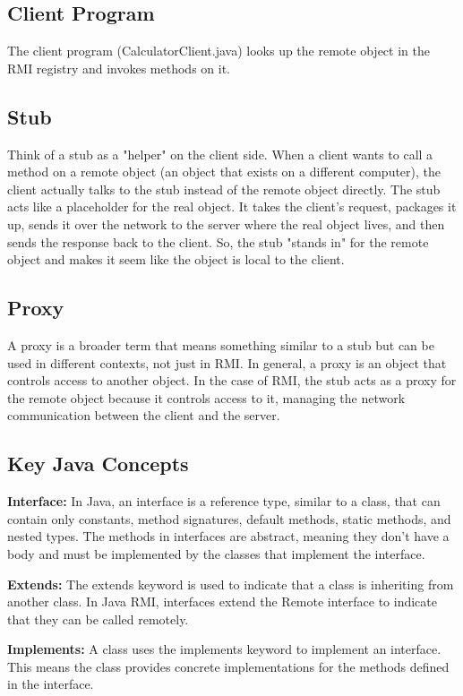 \documentclass[12pt, letterpaper]{article}
\begin{document}
\subsection*{Client Program}
The client program (CalculatorClient.java) looks up the remote 
object in the RMI registry and invokes methods on it.

\subsection*{Stub}
Think of a stub as a "helper" on the client side. When a client wants to call a 
method on a remote object (an object that exists on a different computer), the 
client actually talks to the stub instead of the remote object directly. The stub 
acts like a placeholder for the real object. It takes the client's request, packages 
it up, sends it over the network to the server where the real object lives, and then 
sends the response back to the client. So, the stub "stands in" for the remote object 
and makes it seem like the object is local to the client.

\subsection*{Proxy}
A proxy is a broader term that means something similar to a stub but can be used in 
different contexts, not just in RMI. In general, a proxy is an object that controls 
access to another object. In the case of RMI, the stub acts as a proxy for the remote 
object because it controls access to it, managing the network communication between 
the client and the server.

\subsection*{Key Java Concepts}
\textbf{Interface:} In Java, an interface is a reference type, similar to a class, 
that can contain only constants, method signatures, default methods, static methods, 
and nested types. The methods in interfaces are abstract, meaning they don't have a 
body and must be implemented by the classes that implement the interface.

\textbf{Extends:} The extends keyword is used to indicate that a class is 
inheriting from another class. In Java RMI, interfaces extend the Remote interface 
to indicate that they can be called remotely.

\textbf{Implements:} A class uses the implements keyword to implement an interface.
This means the class provides concrete implementations for the methods defined in the interface.
\end{document}
